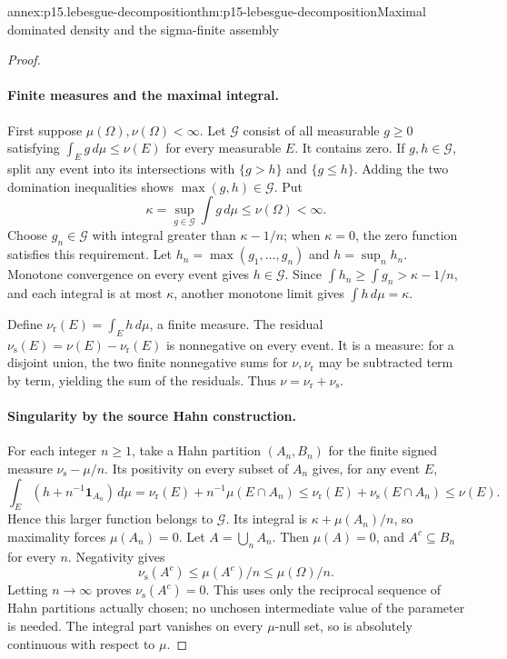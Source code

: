 \begin{annexitem}{annex:p15.lebesgue-decomposition}{thm:p15-lebesgue-decomposition}{Maximal dominated density and the sigma-finite assembly}
\begin{proof}
\paragraph{Finite measures and the maximal integral.}
First suppose \(\mu(\Omega),\nu(\Omega)<\infty\).
Let \(\mathcal G\) consist of all measurable \(g\geq0\) satisfying
\(\int_Eg\,d\mu\leq\nu(E)\) for every measurable \(E\).
It contains zero. If \(g,h\in\mathcal G\), split any event into
its intersections with \(\{g>h\}\) and \(\{g\leq h\}\).
Adding the two domination inequalities shows \(\max(g,h)\in\mathcal G\).
Put
\[
                  \kappa=\sup_{g\in\mathcal G}\int g\,d\mu
                                  \leq\nu(\Omega)<\infty.
\]
Choose \(g_n\in\mathcal G\) with integral greater than \(\kappa-1/n\);
when \(\kappa=0\), the zero function satisfies this requirement.
Let \(h_n=\max(g_1,\ldots,g_n)\) and \(h=\sup_nh_n\).
Monotone convergence on every event gives \(h\in\mathcal G\).
Since \(\int h_n\geq\int g_n>\kappa-1/n\), and each integral is
at most \(\kappa\), another monotone limit gives \(\int h\,d\mu=\kappa\).

Define \(\nu_{\mathrm r}(E)=\int_Eh\,d\mu\), a finite measure.
The residual \(\nu_{\mathrm s}(E)=\nu(E)-\nu_{\mathrm r}(E)\)
is nonnegative on every event. It is a measure: for a disjoint union,
the two finite nonnegative sums for \(\nu,\nu_{\mathrm r}\) may be
subtracted term by term, yielding the sum of the residuals.
Thus \(\nu=\nu_{\mathrm r}+\nu_{\mathrm s}\).

\paragraph{Singularity by the source Hahn construction.}
For each integer \(n\geq1\), take a Hahn partition
\((A_n,B_n)\) for the finite signed measure
\(\nu_{\mathrm s}-\mu/n\).
Its positivity on every subset of \(A_n\) gives, for any event \(E\),
\[
 \int_E(h+n^{-1}\mathbf1_{A_n})\,d\mu
   =\nu_{\mathrm r}(E)+n^{-1}\mu(E\cap A_n)
   \leq\nu_{\mathrm r}(E)+\nu_{\mathrm s}(E\cap A_n)
   \leq\nu(E).
\]
Hence this larger function belongs to \(\mathcal G\).
Its integral is \(\kappa+\mu(A_n)/n\), so maximality forces
\(\mu(A_n)=0\).
Let \(A=\bigcup_nA_n\). Then \(\mu(A)=0\), and \(A^c\subseteq B_n\)
for every \(n\). Negativity gives
\[
                      \nu_{\mathrm s}(A^c)\leq\mu(A^c)/n
                                             \leq\mu(\Omega)/n .
\]
Letting \(n\to\infty\) proves \(\nu_{\mathrm s}(A^c)=0\).
This uses only the reciprocal sequence of Hahn partitions actually
chosen; no unchosen intermediate value of the parameter is needed.
The integral part vanishes on every \(\mu\)-null set, so is absolutely
continuous with respect to \(\mu\).


\end{proof}
\end{annexitem}
